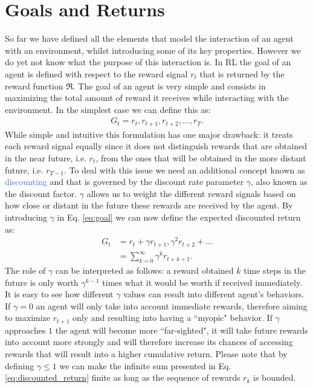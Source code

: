 \section{Goals and Returns}
\label{sec:goals_and_returns}
So far we have defined all the elements that model the interaction of an agent with an environment, whilst introducing some of its key properties. However we do yet not know what the purpose of this interaction is. In RL the goal of an agent is defined with respect to the reward signal $r_t$ that is returned by the reward function $\Re$. The goal of an agent is very simple and consists in maximizing the total amount of reward it receives while interacting with the environment. In the simplest case we can define this as:
\begin{align}
	G_t = r_t, r_{t+1}, r_{t+2}, \ldots, r_{T}.
\label{eq:goal}
\end{align}
While simple and intuitive this formulation has one major drawback: it treats each reward signal equally since it does not distinguish rewards that are obtained in the near future, i.e. $r_t$, from the ones that will be obtained in the more distant future, i.e. $r_{T-1}$. To deal with this issue we need an additional concept known as \textcolor{RoyalBlue}{discounting} and that is governed by the discount rate parameter $\gamma$, also known as the discount factor. $\gamma$ allows us to weight the different reward signals based on how close or distant in the future these rewards are received by the agent. By introducing $\gamma$ in Eq. \ref{eq:goal} we can now define the expected discounted return as:
\begin{align}
	G_t & = r_t+\gamma r_{t+1}, \gamma^{2} r_{t+2} + ... \\
	    & = \sum_{k=0}^{\infty}\gamma^{k} r_{t+k+1}.
\label{eq:discounted_return}
\end{align}
The role of $\gamma$ can be interpreted as follows: a reward obtained $k$ time steps in the future is only worth $\gamma^{k-1}$ times what it would be worth if received immediately. It is easy to see how different $\gamma$ values can result into different agent's behaviors. If $\gamma=0$ an agent will only take into account immediate rewards, therefore aiming to maximize $r_{t+1}$ only and resulting into having a ``myopic" behavior. If $\gamma$ approaches $1$ the agent will become more ``far-sighted", it will take future rewards into account more strongly and will therefore increase its chances of accessing rewards that will result into a higher cumulative return. 
Please note that by defining $\gamma \leq 1$ we can make the infinite sum presented in Eq. \ref{eq:discounted_return} finite as long as the sequence of rewards $r_k$ is bounded.   

